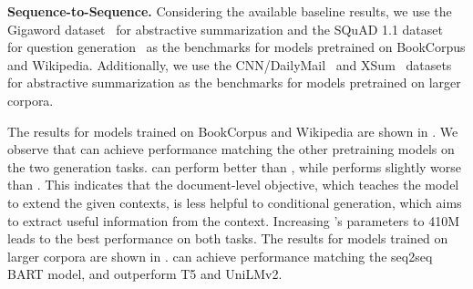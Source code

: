 \begin{table}[t]
\vspace{0.2in}
    \caption{BLEU scores on Yahoo text infilling.  indicates the results from \cite{BLM2020}.}
    \label{tab:yahoo}
\end{table}

\textbf{Sequence-to-Sequence.}
\label{sec:seq2seq}
Considering the available baseline results, we use the Gigaword dataset~\cite{GigawordRushCW15} for abstractive summarization and the SQuAD 1.1 dataset~\cite{SQuAD:RajpurkarZLL16} for question generation~\cite{NQG:du2017} as the benchmarks for models pretrained on BookCorpus and Wikipedia. Additionally, we use the CNN/DailyMail~\cite{GetPointSummarization2017} and XSum~\cite{XSum2018} datasets for abstractive summarization as the benchmarks for models pretrained on larger corpora. 


The results for models trained on BookCorpus and Wikipedia are shown in . We observe that \modelx\largem can achieve performance matching the other pretraining models on the two generation tasks.
\sentmodel can perform better than \largemodel, while
\docmodel performs slightly worse than \modelx\largem. This indicates that the document-level objective, which teaches the model to extend the given contexts, is less helpful to conditional generation, which aims to extract useful information from the context. Increasing \docmodel's parameters to 410M leads to the best performance on both tasks.
The results for models trained on larger corpora are shown in . \modelx\roberta can achieve performance matching the seq2seq BART model, and outperform T5 and UniLMv2.

